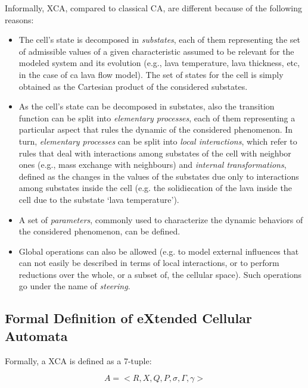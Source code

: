Informally, XCA, compared to classical CA, are different because of
the following reasons:

\begin{itemize}

\item The cell's state is decomposed in \emph{substates}, each of them
  representing the set of admissible values of a given characteristic
  assumed to be relevant for the modeled system and its evolution
  (e.g., lava temperature, lava thickness, etc, in the case of ca lava
  flow model). The set of states for the cell is simply obtained as
  the Cartesian product of the considered substates.

\item As the cell's state can be decomposed in substates, also the
  transition function can be split into \emph{elementary processes},
  each of them representing a particular aspect that rules the dynamic
  of the considered phenomenon. In turn, \emph{elementary processes}
  can be split into \emph{local interactions}, which refer to rules
  that deal with interactions among substates of the cell with
  neighbor ones (e.g., mass exchange with neighbours) and
  \emph{internal transformations}, defined as the changes in the
  values of the substates due only to interactions among substates
  inside the cell (e.g. the solidi¢cation of the lava inside the cell
  due to the substate ‘lava temperature’).

\item A set of \emph{parameters}, commonly used to characterize the
  dynamic behaviors of the considered phenomenon, can be defined.

\item Global operations can also be allowed (e.g. to model external
  influences that can not easily be described in terms of local
  interactions, or to perform reductions over the whole, or a subset
  of, the cellular space). Such operations go under the name of
  \emph{steering}.
  
\end{itemize}


\subsection{Formal Definition of eXtended Cellular Automata}


Formally, a XCA is defined as a 7-tuple:

$$ A = <R,X,Q,P,\sigma,\Gamma,\gamma>$$

